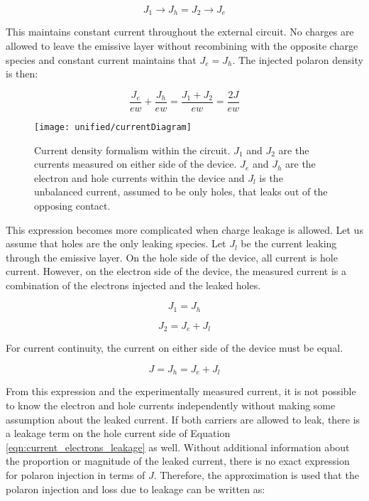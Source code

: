 \documentclass[../thesis.tex]{subfiles}
\begin{document}
\begin{equation}
J_1\rightarrow J_h = J_2 \rightarrow J_e
\label{eqn:current_no_leakage}
\end{equation}

This maintains constant current throughout the external circuit. 
No charges are allowed to leave the emissive layer without recombining with the opposite charge species and constant current maintains that $J_e=J_h$.  
The injected polaron density is then:


\begin{equation}
\frac{J_e}{ew}+\frac{J_h}{ew}=\frac{J_1+J_2}{ew}=\frac{2J}{ew}
\label{eqn:injected_polarons_no_leakage}
\end{equation}

\begin{wrapfigure}[15]{R}{0.5\textwidth}
\texttt{[image: unified/currentDiagram]}
\caption{Current density formalism within the circuit. $J_1$ and $J_2$ are the currents measured on either side of the device. $J_e$ and $J_h$ are the electron and hole currents within the device and $J_l$ is the unbalanced current, assumed to be only holes, that leaks out of the opposing contact.}
\label{fig:currentDiagram}
\end{wrapfigure}
This expression becomes more complicated when charge leakage is allowed. Let us assume that holes are the only leaking species. 
Let $J_l$ be the current leaking through the emissive layer. 
On the hole side of the device, all current is hole current. 
However, on the electron side of the device, the measured current is a combination of the electrons injected and the leaked holes.

\begin{equation}
J_1=J_h
\label{eqn:current_holes_leakage}
\end{equation}

\begin{equation}
J_2=J_e+J_l
\label{eqn:current_electrons_leakage}
\end{equation}

For current continuity, the current on either side of the device must be equal.

\begin{equation}
J=J_h=J_e+J_l
\label{eqn:current_continuity_leakage}
\end{equation}

From this expression and the experimentally measured current, it is not possible to know the electron and hole currents independently without making some assumption about the leaked current.  
If both carriers are allowed to leak, there is a leakage term on the hole current side of Equation \ref{eqn:current_electrons_leakage} as well.  
Without additional information about the proportion or magnitude of the leaked current, there is no exact expression for polaron injection in terms of $J$.  
Therefore, the approximation is used that the polaron injection and loss due to leakage can be written as:
\end{document}
